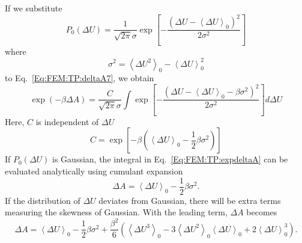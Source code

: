 If we substitute
\begin{equation}
P_{0}(\Delta U) = \frac{1}{\sqrt{2\pi}\sigma}\exp{\left[-\frac{(\Delta U - \left \langle \Delta U \right \rangle_{0})^2}{2\sigma^2}\right]}
\label{Eq:FEM:TP:gaussian}
\end{equation}
where
\begin{equation}
\sigma^2 = \left \langle \Delta U^2 \right \rangle_{0} - \left \langle \Delta U \right \rangle_{0}^2
\label{Eq:FEM:TP:variance}
\end{equation}
to Eq.~\ref{Eq:FEM:TP:deltaA7}, we obtain
\begin{equation}
\exp(-\beta \Delta A) = \frac{C}{\sqrt{2\pi}\sigma} \int \exp{\left[-\frac{(\Delta U - \left \langle \Delta U \right \rangle_{0} - \beta \sigma ^2)^2}{2\sigma^2}\right]} d\Delta U
\label{Eq:FEM:TP:expdeltaA}
\end{equation}
Here, $C$ is independent of $\Delta U$
\begin{equation}
C = \exp{\left[-\beta (\left \langle \Delta U \right \rangle_{0} - \frac{1}{2} \beta \sigma ^2)\right]}
\label{Eq:FEM:TP:C}
\end{equation}
If $P_{0}(\Delta U)$ is Gaussian, the integral in Eq.~\ref{Eq:FEM:TP:expdeltaA} can be evaluated analytically using cumulant expansion
\begin{equation}
\Delta A = \left< \Delta U \right>_{0} - \frac{1}{2} \beta \sigma ^2.
\label{Eq:FEM:TP:deltaA8}
\end{equation}
If the distribution of $\Delta U$ deviates from Gaussian, there will be extra terms measuring the skewness of Gaussian. With the leading term, $\Delta A$ becomes
\begin{equation}
\Delta A = \left< \Delta U \right>_{0} - \frac{1}{2} \beta \sigma ^2 + \frac{\beta^2}{6} \left(\left<\Delta U^3\right>_0-3\left<\Delta U^2\right>_0\left<\Delta U\right>_0+2\left<\Delta U\right>_0^3\right).
\label{Eq:FEM:TP:deltaA9}
\end{equation}
